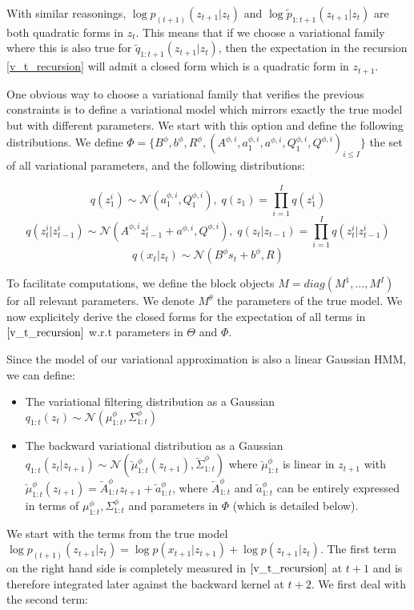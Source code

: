 \documentclass{article}
\newcommand{\1}{\mathbbm{1}}
\newcommand{\eqsp}{\;}
\newcommand{\gaussian}[2]{\mathcal{N}\left( #1, #2 \right)}
\newcommand{\backward}[1]{\overleftarrow{#1}}
\newcommand{\vbackward}[1]{q_{1:#1}(z_{#1}|z_{#1 + 1})}
\newcommand{\vfilt}[1]{q_{1:#1}(z_{#1})}
\newcommand{\vbackwardparam}[2]{\backward{#1}_{1:#2}^\phi}
\newcommand{\vbackwardmean}[1]{\vbackwardparam{\mu}{#1}}
\newcommand{\vbackwardcov}[1]{\vbackwardparam{\Sigma}{#1}}
\begin{document}
With similar reasonings, $\log p_{(t+1)}(z_{t+1}|z_t)$ and $\log \tilde{p}_{1:t+1}(z_{t+1}|z_t)$ are both quadratic forms in $z_t$. This means that if we choose a variational family where this is also true for $\tilde{q}_{1:t+1}(z_{t+1}|z_t)$, then the expectation in the recursion \ref{v_t_recursion} will admit a closed form which is a quadratic form in $z_{t+1}$.
                                                    
One obvious way to choose a variational family that verifies the previous constraints is to define a variational model which mirrors exactly the true model but with different parameters. We start with this option and define the following distributions. We define $\Phi = \{B^\phi, b^\phi, R^\phi, (A^{\phi,i}, a_1^{\phi,i}, a^{\phi,i}, Q_1^{\phi,i}, Q^{\phi,i})_{i \leq I}\}$ the set of all variational parameters, and the following distributions:

$$q(z_1^i) \sim \gaussian{a_1^{\phi,i}}{Q_1^{\phi,i}}, \eqsp q(z_1) = \prod_{i=1}^I q(z_1^i)$$
$$q(z_t^i|z_{t-1}^i) \sim \gaussian{A^{\phi,i} z_{t-1}^i + a^{\phi,i}}{Q^{\phi,i}}, \eqsp q(z_t|z_{t-1}) = \prod_{i=1}^I q(z_t^i|z_{t-1}^i)$$
$$q(x_t|z_t) \sim \gaussian{B^\phi s_t + b^\phi}{R}$$

To facilitate computations, we define the block objects $M = diag(M^1, \ldots, M^I)$ for all relevant parameters. We denote $M^\theta$ the parameters of the true model. We now explicitely derive the closed forms for the expectation of all terms in $\ref{v_t_recursion}$ w.r.t parameters in $\Theta$ and $\Phi$. 

Since the model of our variational approximation is also a linear Gaussian HMM, we can define: 

\begin{itemize}
    \item The variational filtering distribution as a Gaussian $\vfilt{t} \sim \gaussian{\mu_{1:t}^\phi}{\Sigma_{1:t}^\phi}$
    \item The backward variational distribution as a Gaussian $\vbackward{t} \sim \gaussian{\vbackwardmean{t}(z_{t+1})}{\vbackwardcov{t}}$ where $\vbackwardmean{t}$ is linear in $z_{t+1}$ with $\vbackwardmean{t}(z_{t+1}) = \backward{A}_{1:t}^\phi z_{t+1} + \backward{a}_{1:t}^\phi$, where $\backward{A}_{1:t}^\phi$ and $\backward{a}_{1:t}^\phi$ can be entirely expressed in terms of $\mu_{1:t}^\phi, \Sigma_{1:t}^\phi$ and parameters in $\Phi$ (which is detailed below).
\end{itemize} 

We start with the terms from the true model $\log p_{(t+1)}(z_{t+1}|z_t) = \log p(x_{t+1}|z_{t+1}) + \log p(z_{t+1}|z_t)$. The first term on the right hand side is completely measured in $\ref{v_t_recursion}$ at $t+1$ and is therefore integrated later against the backward kernel at $t+2$. We first deal with the second term:
\end{document}
